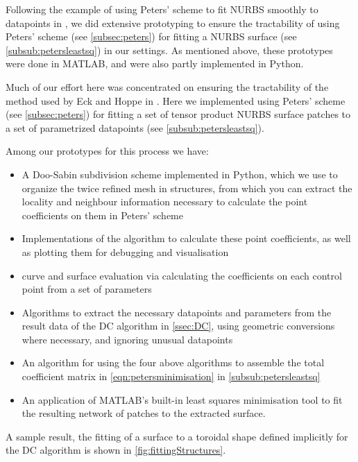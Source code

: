 
Following the example of using Peters' scheme to fit NURBS smoothly to datapoints in \cite{eck1996automatic}, we did extensive prototyping to ensure the tractability of using Peters' scheme (see \autoref{subsec:peters}) for fitting a NURBS surface (see \autoref{subsub:petersleastsq}) in our settings. As mentioned above, these prototypes were done in MATLAB, and were also partly implemented in Python. 

Much of our effort here was concentrated on ensuring the tractability of the method used by Eck and Hoppe in \cite{eck1996automatic}. Here we implemented using Peters' scheme (see \autoref{subsec:peters}) for fitting a set of tensor product NURBS surface patches to a set of parametrized datapoints (see \autoref{subsub:petersleastsq}).

Among our prototypes for this process we have:
\begin{itemize}
\item A Doo-Sabin subdivision scheme implemented in Python, which we use to organize the twice refined mesh in structures, from which you can extract the locality and neighbour information necessary to calculate the \Bez point coefficients on them in Peters' scheme
\item Implementations of the algorithm to calculate these \Bez point coefficients, as well as plotting them for debugging and visualisation
\item \Bez curve and surface evaluation via calculating the coefficients on each \Bez control point from a set of parameters
\item Algorithms to extract the necessary datapoints and parameters from the result data of the \acf{DC} algorithm in \autoref{ssec:DC}, using geometric conversions where necessary, and ignoring unusual datapoints
\item An algorithm for using the four above algorithms to assemble the total coefficient matrix in \autoref{eqn:petersminimisation} in \autoref{subsub:petersleastsq}
\item An application of MATLAB's built-in least squares minimisation tool to fit the resulting network of \Bez patches to the extracted surface.
\end{itemize}
A sample result, the fitting of a surface to a toroidal shape defined implicitly for the \acs{DC} algorithm is shown in \autoref{fig:fittingStructures}.


